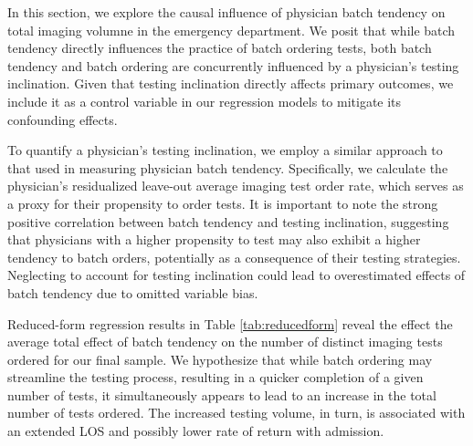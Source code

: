 \documentclass[,,nonblindrev]{informs}
\begin{document}
In this section, we explore the causal influence of physician batch
tendency on total imaging volumne in the emergency department. We posit
that while batch tendency directly influences the practice of batch
ordering tests, both batch tendency and batch ordering are concurrently
influenced by a physician's testing inclination. Given that testing
inclination directly affects primary outcomes, we include it as a
control variable in our regression models to mitigate its confounding
effects.

To quantify a physician's testing inclination, we employ a similar
approach to that used in measuring physician batch tendency.
Specifically, we calculate the physician's residualized leave-out
average imaging test order rate, which serves as a proxy for their
propensity to order tests. It is important to note the strong positive
correlation between batch tendency and testing inclination, suggesting
that physicians with a higher propensity to test may also exhibit a
higher tendency to batch orders, potentially as a consequence of their
testing strategies. Neglecting to account for testing inclination could
lead to overestimated effects of batch tendency due to omitted variable
bias.

Reduced-form regression results in Table \ref{tab:reducedform} reveal
the effect the average total effect of batch tendency on the number of
distinct imaging tests ordered for our final sample. We hypothesize that
while batch ordering may streamline the testing process, resulting in a
quicker completion of a given number of tests, it simultaneously appears
to lead to an increase in the total number of tests ordered. The
increased testing volume, in turn, is associated with an extended LOS
and possibly lower rate of return with admission.
\end{document}
